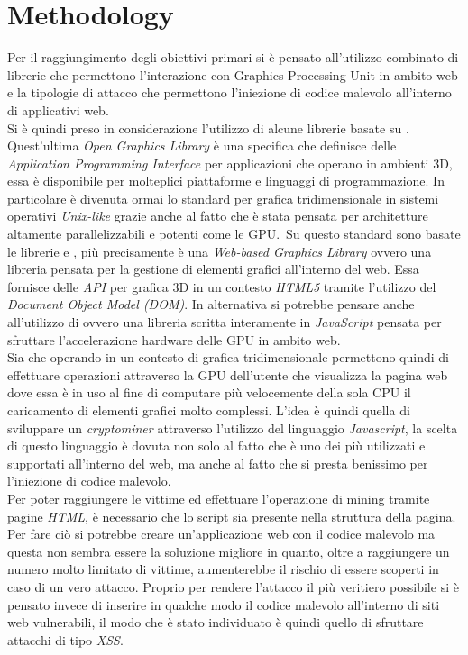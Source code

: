 \documentclass[
11pt, %
oneside, %
english, %
onehalfspacing,%
headsepline, %
]{MastersDoctoralThesis} %
\newcommand\citetitlen[1]{\citetitle{#1} \citep{#1}}
\begin{document}
{\chapter{Methodology}}
Per il raggiungimento degli obiettivi primari si è pensato all'utilizzo combinato di librerie che permettono l'interazione con Graphics Processing Unit in ambito web e la tipologie di attacco che permettono l'iniezione di codice malevolo all'interno di applicativi web.\\
Si è quindi preso in considerazione l'utilizzo di alcune librerie basate su \citetitlen{OpenGL}. Quest'ultima \emph{Open Graphics Library} è una specifica che definisce delle \emph{Application Programming Interface} per applicazioni che operano in ambienti 3D, essa è disponibile per molteplici piattaforme e linguaggi di programmazione. In particolare è divenuta ormai lo standard per grafica tridimensionale in sistemi operativi \emph{Unix-like} grazie anche al fatto che è stata pensata per architetture altamente parallelizzabili e potenti come le GPU.\ Su questo standard sono basate le librerie \citetitlen{WebGL} e \citetitlen{GPU.js}, più precisamente  è una \emph{Web-based Graphics Library} ovvero una libreria pensata per la gestione di elementi grafici all'interno del web. Essa fornisce delle \emph{API} per grafica 3D in un contesto \emph{HTML5} tramite l'utilizzo del \emph{Document Object Model (DOM)}. In alternativa si potrebbe pensare anche all'utilizzo di  ovvero una libreria scritta interamente in \emph{JavaScript} pensata per sfruttare l'accelerazione hardware delle GPU in ambito web.\\
Sia  che  operando in un contesto di grafica tridimensionale permettono quindi di effettuare operazioni attraverso la GPU dell'utente che visualizza la pagina web dove essa è in uso al fine di computare più velocemente della sola CPU il caricamento di elementi grafici molto complessi. L'idea è quindi quella di sviluppare un \emph{cryptominer} attraverso l'utilizzo del linguaggio \emph{Javascript}, la scelta di questo linguaggio è dovuta non solo al fatto che è uno dei più utilizzati e supportati all'interno del web, ma anche al fatto che si presta benissimo per l'iniezione di codice malevolo.\\
Per poter raggiungere le vittime ed effettuare l'operazione di mining tramite pagine \emph{HTML}, è necessario che lo script sia presente nella struttura della pagina. Per fare ciò si potrebbe creare un'applicazione web con il codice malevolo ma questa non sembra essere la soluzione migliore in quanto, oltre a raggiungere un numero molto limitato di vittime, aumenterebbe il rischio di essere scoperti in caso di un vero attacco. Proprio per rendere l'attacco il più veritiero possibile si è pensato invece di inserire in qualche modo il codice malevolo all'interno di siti web vulnerabili, il modo che è stato individuato è quindi quello di sfruttare attacchi di tipo \emph{XSS}.\\
\end{document}
